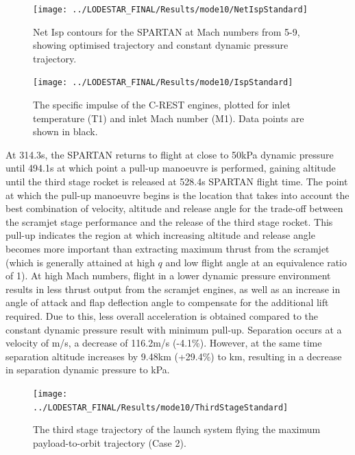 \begin{figure}[ht!]
	\centering
	\texttt{[image: ../LODESTAR\_FINAL/Results/mode10/NetIspStandard]}
	\caption{Net Isp contours for the SPARTAN at Mach numbers from 5-9, showing optimised trajectory and constant dynamic pressure trajectory.}
	\label{fig:NetIspStandardNoReturn}
\end{figure}

\begin{figure}[ht!]
	\centering
	\texttt{[image: ../LODESTAR\_FINAL/Results/mode10/IspStandard]}
	\caption{The specific impulse of the C-REST engines, plotted for inlet temperature (T1) and inlet Mach number (M1). Data points are shown in black.}
	\label{fig:IspStandard}
\end{figure}


At 314.3s, the SPARTAN returns to flight at close to 50kPa dynamic pressure until 494.1s at which point a pull-up manoeuvre is performed, gaining altitude until the third stage rocket is released at 528.4s SPARTAN flight time. 
 The point at which the pull-up manoeuvre begins is the location that takes into account the best combination of velocity, altitude and release angle for the trade-off between the scramjet stage performance and the release of the third stage rocket. This pull-up indicates the region at which increasing altitude and release angle becomes more important than extracting maximum thrust from the scramjet (which is generally attained at high $q$ and low flight angle at an equivalence ratio of 1).
At high Mach numbers, flight in a lower dynamic pressure environment results in less thrust output from the scramjet engines, as well as an increase in angle of attack and flap deflection angle to compensate for the additional lift required. Due to this, less overall acceleration is obtained compared to the constant dynamic pressure result with minimum pull-up. Separation occurs at a velocity of \secondthirdSeparationvStandardNoReturn m/s, a decrease of 116.2m/s (-4.1\%). However, at the same time separation altitude increases by 9.48km (+29.4\%) to \secondthirdSeparationAltqStandardNoReturn km, resulting in a decrease in separation dynamic pressure to \secondthirdSeparationqStandardNoReturn kPa. 
\begin{figure}[ht!]
	\centering
	\texttt{[image: ../LODESTAR\_FINAL/Results/mode10/ThirdStageStandard]}
	\caption{The third stage trajectory of the launch system flying the maximum payload-to-orbit trajectory (Case 2).}
	\label{fig:ThirdStageStandardNoReturn}
\end{figure}
